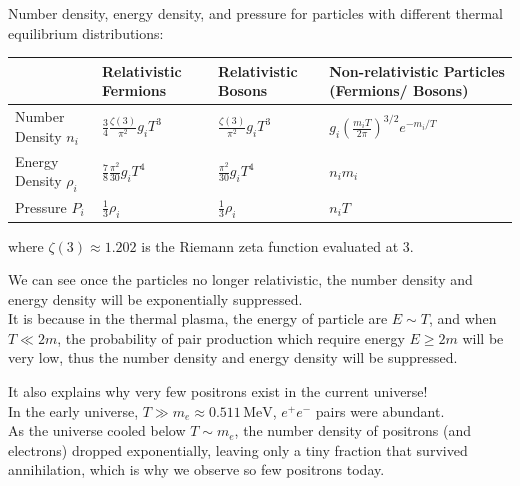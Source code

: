 \clearpage
\begin{theory}
    Number density, energy density, and pressure for particles with different thermal equilibrium distributions:

    \begin{center}
    {\renewcommand{\arraystretch}{1.8}
    \begin{tabular}{p{3.5cm}|p{2.5cm}|p{2.5cm}|p{3.5cm}}
        \toprule
        & {\small Relativistic Fermions} & {\small Relativistic Bosons} & {\small Non-relativistic Particles (Fermions/ Bosons)} \\
        \midrule
        {\small Number Density $n_i$} & $\frac{3}{4}\frac{\zeta(3)}{\pi^2} g_i T^3$ & $\frac{\zeta(3)}{\pi^2} g_i T^3$ & $g_i \left( \frac{m_i T}{2\pi} \right)^{3/2} e^{-m_i/T}$ \\
        {\small Energy Density $\rho_i$} & $\frac{7}{8}\frac{\pi^2}{30} g_i T^4$ & $\frac{\pi^2}{30} g_i T^4$ & $n_i m_i$ \\
        {\small Pressure $P_i$} & $\frac{1}{3}\rho_i$ & $\frac{1}{3}\rho_i$ & $n_i T$ \\
        \bottomrule
        \end{tabular}
    }
    \end{center}

    where $\zeta(3) \approx 1.202$ is the Riemann zeta function evaluated at 3.
\end{theory}

\bigskip\noindent
We can see once the particles no longer relativistic, the number density and energy density will be exponentially suppressed. \\
It is because in the thermal plasma, the energy of particle are $ E \sim T$, and when $T \ll 2m$, the probability of pair production which require energy $E \geq 2m$ will be very low, thus the number density and energy density will be suppressed.

\begin{intuition}
    It also explains why very few positrons exist in the current universe! \\
    In the early universe, $T \gg m_e \approx 0.511\,\mathrm{MeV}$, $e^+e^-$ pairs were abundant. \\
    As the universe cooled below $T \sim m_e$, the number density of positrons (and electrons) dropped exponentially, leaving only a tiny fraction that survived annihilation, which is why we observe so few positrons today.
\end{intuition}

